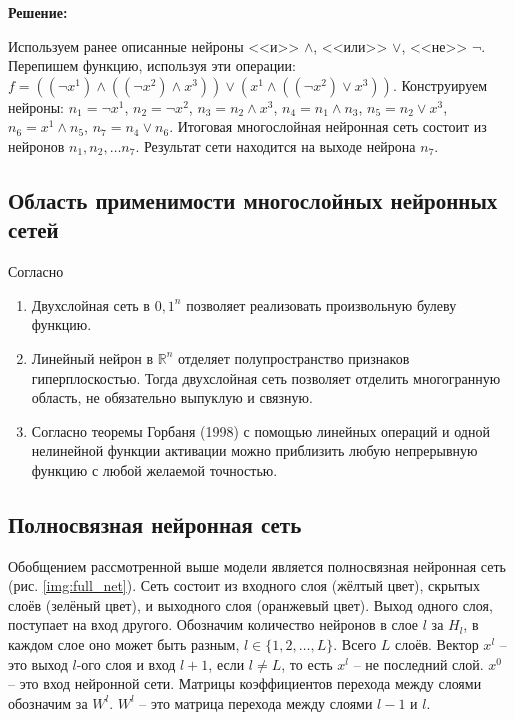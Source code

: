 \textbf{Решение:}

Используем ранее описанные нейроны <<и>> $\wedge$, <<или>> $\vee$, <<не>> $\neg$. Перепишем функцию, используя эти операции: $f = ((\neg x^1) \wedge ((\neg x^2) \wedge x^3)) \vee (x^1 \wedge ((\neg x^2) \vee x^3))$. Конструируем нейроны: $n_1 = \neg x^1$, $n_2 = \neg x^2$, $n_3 = n_2 \wedge x^3$, $n_4 = n_1 \wedge n_3$, $n_5 = n_2 \vee x^3$, $n_6 = x^1 \wedge n_5$, $n_7 = n_4 \vee n_6$. Итоговая многослойная нейронная сеть состоит из нейронов $n_1, n_2, \dots n_7$. Результат сети находится на выходе нейрона $n_7$.

\newpage

\subsection{Область применимости многослойных нейронных сетей}

Согласно \cite{VorontsovSite}
\begin{enumerate}
	\item Двухслойная сеть в ${0, 1}^n$ позволяет реализовать произвольную булеву функцию.

	\item Линейный нейрон в $\mathbb{R}^n$ отделяет полупространство признаков гиперплоскостью. Тогда двухслойная сеть позволяет отделить многогранную область, не обязательно выпуклую и связную.

	\item Согласно теоремы Горбаня (1998) с помощью линейных операций и одной нелинейной функции активации можно приблизить любую непрерывную функцию с любой желаемой точностью.
\end{enumerate}

\subsection{Полносвязная нейронная сеть}

Обобщением рассмотренной выше модели является полносвязная нейронная сеть (рис. \ref{img:full_net}). Сеть состоит из входного слоя (жёлтый цвет), скрытых слоёв (зелёный цвет), и выходного слоя (оранжевый цвет). Выход одного слоя, поступает на вход другого. Обозначим количество нейронов в слое $l$ за $H_l$, в каждом слое оно может быть разным, $l \in \{1, 2, \dots, L\}$. Всего $L$ слоёв. Вектор $x^l$ -- это выход $l$-ого слоя и вход $l+1$, если $l \neq L$, то есть $x^l$ -- не последний слой. $x^0$ -- это вход нейронной сети. Матрицы коэффициентов перехода между слоями обозначим за $W^l$. $W^l$ -- это матрица перехода между слоями $l-1$ и $l$.

